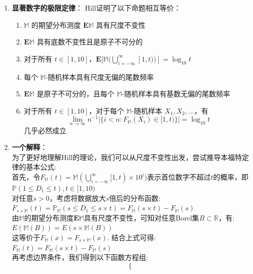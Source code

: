 \documentclass{ctexart} %
\begin{document}
\begin{enumerate}
    \item \textbf{显著数字的极限定律}：
    Hill证明了以下命题相互等价：
    \begin{enumerate}
        \item  $\mathbb{M}$ 的期望分布测度 $\mathbf{E}\mathbb{M}$ 具有尺度不变性
        \item  $\mathbf{E}\mathbb{M}$ 具有底数不变性且是原子不可分的
        \item  对于所有 $t \in [1, 10]$，$\mathbf{E}[\mathbb{M}(\bigcup_{i=-\infty}^{\infty}[1, t))] = \log_{10} t$
        \item  每个 $\mathbb{M}$-随机样本具有尺度无偏的尾数频率
        \item  $\mathbf{E}\mathbb{M}$ 是原子不可分的，且每个 $\mathbb{M}$-随机样本具有基数无偏的尾数频率
        \item  对于所有 $t \in [1, 10]$，对于每个 $\mathbb{M}$-随机样本 $X_1, X_2, \ldots$，有
            \begin{equation}
                \lim_{n\to\infty} n^{-1} \left\vert \{ i < n : F_\mathbb{M}(X_i) \in [1, t) \} \right\vert = \log_{10} t
            \end{equation}
            几乎必然成立
    \end{enumerate}
    \item \textbf{一个解释}：\\
    为了更好地理解Hill的理论，我们可以从尺度不变性出发，尝试推导本福特定律的基本公式:\\
        首先，令$F_\mathbb{M}(t)=\mathbb{M}(\bigcup_{i=-\infty}^{\infty}[1,t)\times10^i)$表示首位数字不超过$t$的概率，即$\mathbb{P}(1\leq D_1 \leq t), t\in[1,10)$\\
        对任意$s>0$，考虑将数据放大$s$倍后的分布函数:\\
        $F_{s\times\mathbb{M}}(t)=\mathbb{P}_{\mathbb{M}}(s \leq D_1 \leq s\times t)=F_{\mathbb{M}}(s\times t) - F_{\mathbb{M}}(s)$\\
        由$\mathbb{M}$的期望分布测度$\mathbf{E}\mathbb{M}$具有尺度不变性，可知对任意Borel集$B\subset \mathbb{R}$，有:\\
        $E(\mathbb{M}(B))=E(s\times\mathbb{M}(B))$\\
        这等价于$F_\mathbb{M}(x)=F_{s\times\mathbb{M}}(x)$. 结合上式可得:\\
        $F_{\mathbb{M}}(t)=F_{\mathbb{M}}(s\times t)-F_{\mathbb{M}}(s)$\\
        再考虑边界条件，我们得到以下函数方程组:
        \begin{equation}
            \begin{cases}

\end{cases}
\end{equation}
\end{enumerate}
\end{document}
